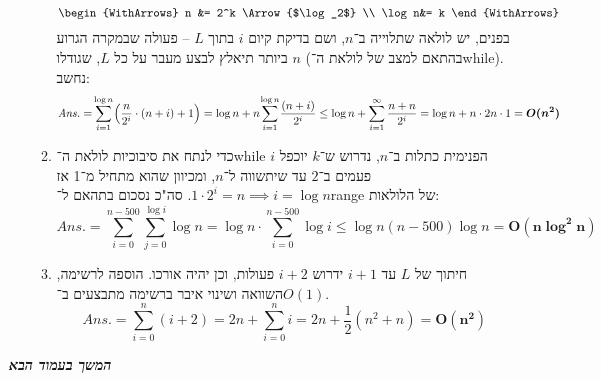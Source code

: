 \documentclass[]{article}
\newcommand\npage {\vfil {\hfil \textbf{\textit{המשך בעמוד הבא}}} \hfil \vfil \pagebreak}
\newcommand\ans   {\mathit{Ans.}}
\newcommand\logn  {\log n}
\renewcommand\inf {\infty}
\newcommand\cl [1]    {\left ( #1 \right )}
\begin{document}
\begin{enumerate}[A)]
\begin{enumerate}[1.]
\[\begin{WithArrows}
				n &= 2^k \Arrow{$\log_2$} \\
				\logn &= k
			\end{WithArrows} \]
			בפנים, יש לולאה שתלוייה ב־$n$, ושם בדיקת קיום $i$ בתוך $L$ – פעולה שבמקרה הגרוע ביותר תיאלץ לבצע מעבר על כל $L$, שגודלו $n$ (בהתאם למצב של לולאת ה־while). נחשב: 
			\[ \ans = \sum_{i = 1}^{\mathclap{\logn}}\cl{\frac{n}{2^i}\cdot (n + i) + 1} = \logn + n\sum_{i = 1}^{\mathclap{\logn}}\frac{(n + i)}{2^i} \le \logn + \sum_{i = 1}^{\inf}\frac{n + n}{2^i} = \logn + n \cdot 2n \cdot 1 = \bm{O(n^2)} \]
			\item כדי לנתח את סיבוכיות לולאת ה־while הפנימית כתלות ב־$n$, נדרוש ש־$k$ יוכפל $i$ פעמים ב־$2$ עד שיתשווה ל־$n$, ומכיוון שהוא מתחיל מ־1 אז $1 \cdot 2^i = n \implies i = \logn$. סה"כ נסכום בתהאם ל־range של הלולאות: 
			\[ \ans = \sum_{i = 0}^{n - 500}\sum_{j = 0}^{\log i}\logn = \log n \cdot \sum_{i = 0}^{n - 500}\log i \le \logn (n - 500)\logn = \bm{O(n\log^2n)} \]
			\item חיתוך של $L$ עד $i + 1$ ידרוש $i + 2$ פעולות, וכן יהיה אורכו. הוספה לרשימה, השוואה ושינוי איבר ברשימה מתבצעים ב־$O(1)$. 
			\[ \ans = \sum_{i = 0}^{n}(i + 2) = 2n + \sum_{i = 0}^{n}i = 2n + \frac{1}{2}(n^2 + n) = \bm{O(n^2)} \]
		\end{enumerate}
	\end{enumerate}
	\npage
\end{document}
